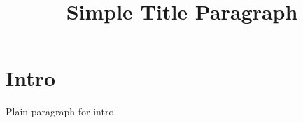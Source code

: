 \documentclass{article}
\begin{document}
\title{Simple Title Paragraph}\maketitle
\section{Intro}\label{sec:intro} Plain paragraph for intro.
\end{document}
